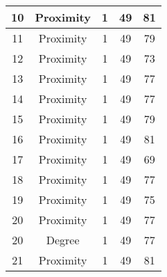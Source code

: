 \documentclass[results.tex]{subfiles}
\begin{document}
\begin{center}
\begin{tabular}{| c || c | c | c | c |}
            \hline
            10                      & Proximity                    & 1                      & 49                      & 81                   \\
            \hline
            11                      & Proximity                    & 1                      & 49                      & 79                   \\
            \hline
            12                      & Proximity                    & 1                      & 49                      & 73                   \\
            \hline
            13                      & Proximity                    & 1                      & 49                      & 77                   \\
            \hline
            14                      & Proximity                    & 1                      & 49                      & 77                   \\
            \hline
            15                      & Proximity                    & 1                      & 49                      & 79                   \\
            \hline
            16                      & Proximity                    & 1                      & 49                      & 81                   \\
            \hline
            17                      & Proximity                    & 1                      & 49                      & 69                   \\
            \hline
            18                      & Proximity                    & 1                      & 49                      & 77                   \\
            \hline
            19                      & Proximity                    & 1                      & 49                      & 75                   \\
            \hline
            20                      & Proximity                    & 1                      & 49                      & 77                   \\
            \hline
            20                      & Degree                       & 1                      & 49                      & 77                   \\
            \hline
            21                      & Proximity                    & 1                      & 49                      & 81                   \\

\end{tabular}
\end{center}
\end{document}
